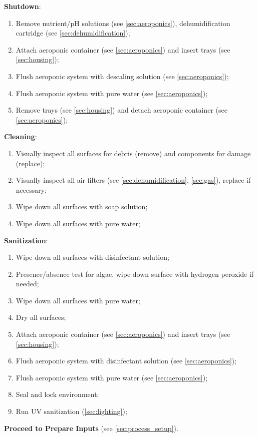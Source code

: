 \textbf{Shutdown}:
\begin{enumerate}
    \item Remove nutrient/pH solutions (see \ref{sec:aeroponics}), dehumidification cartridge (see \ref{sec:dehumidification});
    \item Attach aeroponic container (see \ref{sec:aeroponics}) and insert trays (see \ref{sec:housing});
    \item Flush aeroponic system with descaling solution (see \ref{sec:aeroponics});
    \item Flush aeroponic system with pure water (see \ref{sec:aeroponics});
    \item Remove trays (see \ref{sec:housing}) and detach aeroponic container (see \ref{sec:aeroponics});
\end{enumerate}

\textbf{Cleaning}:
\begin{enumerate}
    \item Visually inspect all surfaces for debris (remove) and components for damage (replace);
    \item Visually inspect all air filters (see \ref{sec:dehumidification}, \ref{sec:gas}), replace if necessary;
    \item Wipe down all surfaces with soap solution;
    \item Wipe down all surfaces with pure water;
\end{enumerate}

\textbf{Sanitization}:
\begin{enumerate}
    \item Wipe down all surfaces with disinfectant solution;
    \item Presence/absence test for algae, wipe down surface with hydrogen peroxide if needed;
    \item Wipe down all surfaces with pure water;
    \item Dry all surfaces;
    \item Attach aeroponic container (see \ref{sec:aeroponics}) and insert trays (see \ref{sec:housing});
    \item Flush aeroponic system with disinfectant solution (see \ref{sec:aeroponics});
    \item Flush aeroponic system with pure water (see \ref{sec:aeroponics});
    \item Seal and lock environment;
    \item Run UV sanitization (\ref{sec:lighting});
\end{enumerate}

\textbf{Proceed to Prepare Inputs} (see \ref{sec:process_setup}).